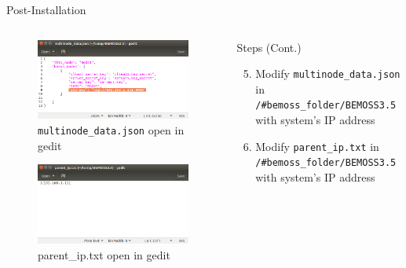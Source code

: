 \documentclass{beamer}
\begin{document}
\begin{frame}{Post-Installation}
	\begin{columns}[T]
		\begin{column}{0.5\textwidth}
			\begin{figure}
				\includegraphics[scale=0.2]{figs/multinodeChange.png}
				\caption{\texttt{multinode\_data.json} open in gedit}
			\end{figure}
			\begin{figure}
				\includegraphics[scale=0.2]{figs/parentipChange.png}
				\caption{parent\_ip.txt open in gedit}
			\end{figure}
		\end{column}
		\begin{column}{0.5\textwidth}
			\begin{block}{Steps (Cont.)}
				\begin{enumerate}
					\setcounter{enumi}{4}
					\item Modify \texttt{multinode\_data.json} in \texttt{/\#bemoss\_folder/BEMOSS3.5} with system's IP address
					\item Modify \texttt{parent\_ip.txt} in \texttt{/\#bemoss\_folder/BEMOSS3.5} with system's IP address
				\end{enumerate}
			\end{block}
		\end{column}
	\end{columns}
\end{frame}
\end{document}
